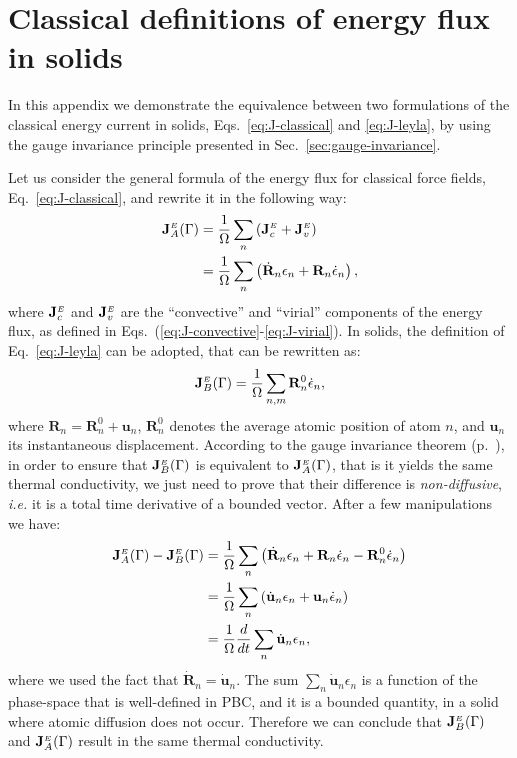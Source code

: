 
\chapter{Classical definitions of energy flux in solids}  \label{ch:appendix-carbogno}

In this appendix we demonstrate the equivalence between two formulations of the classical energy current in solids, Eqs.~\eqref{eq:J-classical} and \eqref{eq:J-leyla}, by using the gauge invariance principle presented in Sec.~\ref{sec:gauge-invariance}. 

Let us consider the general formula of the energy flux for classical force fields, Eq.~\eqref{eq:J-classical}, and rewrite it in the following way:
\begin{align}
    \mathbf{J}_A^\smallE (\rGamma) &= \frac{1}{\Omega} \sum_n \left( \mathbf{J}_c^\smallE + \mathbf{J}_v^\smallE \right) \nonumber\\
        &= \frac{1}{\Omega} \sum_n \left( \dot{\mathbf{R}}_n \epsilon_n + \mathbf{R}_n \dot{\epsilon}_n \right) , \label{eq:apx-J-classical}
\end{align}
where $\mathbf{J}_c^{\scriptscriptstyle E}$ and $\mathbf{J}_v^{\scriptscriptstyle E}$ are the ``convective'' and ``virial'' components of the energy flux, as defined in Eqs.~(\ref{eq:J-convective}-\ref{eq:J-virial}). 
In solids, the definition of Eq.~\eqref{eq:J-leyla} can be adopted, that can be rewritten as:
\begin{equation}
    \mathbf{J}_B^\smallE(\rGamma) =
       \frac{1}{\rOmega} \sum_{n,m} \mathbf{R}_n^0 \dot{\epsilon}_n , \label{eq:apx-J-leyla}
\end{equation}
where $\mathbf{R}_n = \mathbf{R}_n^0 + \mathbf{u}_n$, $\mathbf{R}_n^0$ denotes the average atomic position of atom $n$, and $\mathbf{u}_n$ its instantaneous displacement. 
According to the gauge invariance theorem (p.~\pageref{th:gauge-invariance}), in order to ensure that $\mathbf{J}_B^{\scriptscriptstyle E}({\mathrm\Gamma})$ is equivalent to $\mathbf{J}_A^{\scriptscriptstyle E}({\mathrm\Gamma})$, that is it yields the same thermal conductivity, we just need to prove that their difference is \emph{non-diffusive}, \emph{i.e.} it is a total time derivative of a bounded vector. 
After a few manipulations we have:
\begin{align}
    \mathbf{J}_A^{\scriptscriptstyle E}({\mathrm\Gamma}) - \mathbf{J}_B^{\scriptscriptstyle E}({\mathrm\Gamma}) 
        &= \frac{1}{\Omega} \sum_n \left( \dot{\mathbf{R}}_n \epsilon_n + \mathbf{R}_n \dot{\epsilon}_n - \mathbf{R}_n^0 \dot{\epsilon}_n \right) \nonumber\\
        &= \frac{1}{\Omega} \sum_n \left( \dot{\mathbf{u}}_n \epsilon_n + \mathbf{u}_n \dot{\epsilon}_n \right) \nonumber\\
        &= \frac{1}{\Omega} \frac{d}{dt} \sum_n \dot{\mathbf{u}}_n \epsilon_n ,
\end{align}
where we used the fact that $\dot{\mathbf{R}}_n = \dot{\mathbf{u}}_n$.
The sum $\sum_n \dot{\mathbf{u}}_n \epsilon_n$ is a function of the phase-space that is well-defined in PBC, and it is a bounded quantity, in a solid where atomic diffusion does not occur. Therefore we can conclude that $\mathbf{J}_B^{\scriptscriptstyle E}({\mathrm\Gamma})$ and $\mathbf{J}_A^{\scriptscriptstyle E}({\mathrm\Gamma})$ result in the same thermal conductivity. 


